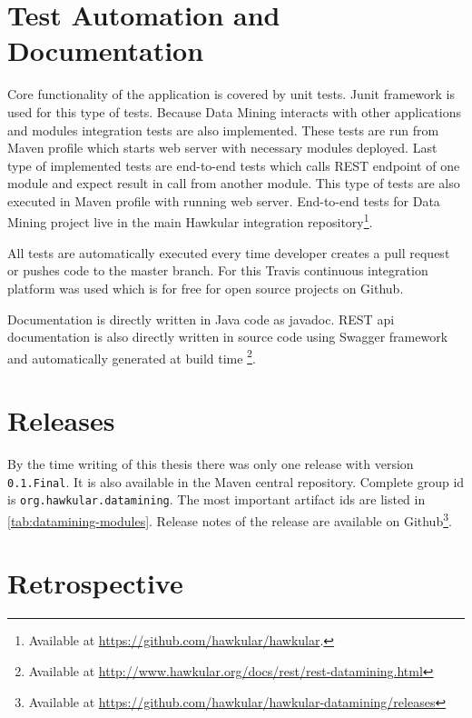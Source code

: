 
    \section{Test Automation and Documentation}
    Core functionality of the application is covered by unit tests. Junit framework is used for this type of tests.
    Because Data Mining interacts with other applications and modules integration tests are also implemented. These
    tests are run from Maven profile which starts web server with necessary modules deployed.
    Last type of implemented tests are end-to-end tests which calls REST endpoint of one module and expect result
    in call from another module. This type of tests are also executed in Maven profile with running web server.
    End-to-end tests for Data Mining project live in the main Hawkular integration repository\footnote{
    Available at \url{https://github.com/hawkular/hawkular}.}.

    All tests are automatically executed every time developer creates a pull request or pushes code to the master
    branch. For this Travis continuous integration platform was used which is for free for open source projects on
    Github.

    Documentation is directly written in Java code as javadoc. REST api documentation is also directly
    written in source code using Swagger framework and automatically generated at build time
    \footnote{Available at \url{http://www.hawkular.org/docs/rest/rest-datamining.html}}.

    \section{Releases}
    By the time writing of this thesis there was only one release with version \texttt{0.1.Final}. It is also available
    in the Maven central repository. Complete group id is \texttt{org.hawkular.datamining}. The most important
    artifact ids are listed in \ref{tab:datamining-modules}. Release notes of the release are available on
    Github\footnote{Available at \url{https://github.com/hawkular/hawkular-datamining/releases}}.

    \section{Retrospective}


